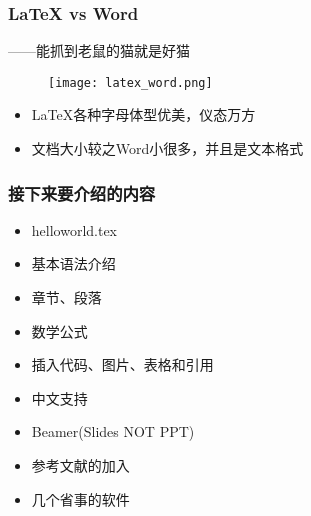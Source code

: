 \begin{frame}\frametitle{\LaTeX{} vs Word}{——能抓到老鼠的猫就是好猫}
    \begin{figure}[h]
        \texttt{[image: latex\_word.png]}
    \end{figure}
    \begin{itemize}
         \item \LaTeX{}各种字母体型优美，仪态万方
         \item 文档大小较之Word小很多，并且是文本格式
    \end{itemize}
\end{frame}

\begin{frame}\frametitle{接下来要介绍的内容}
    \begin{itemize}
         \item helloworld.tex
         \item 基本语法介绍
         \item 章节、段落
         \item 数学公式
         \item 插入代码、图片、表格和引用
         \item 中文支持
         \item Beamer(Slides NOT PPT)
         \item 参考文献的加入
         \item 几个省事的软件
    \end{itemize}
\end{frame}